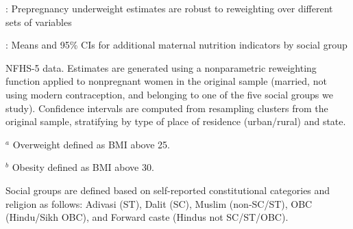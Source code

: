 \documentclass[12pt]{article}
\begin{document}
\begin{landscape}
    


\begin{table}[H]
    \centering

    \begin{threeparttable}
            
    \caption{: Prepregnancy underweight estimates are robust to reweighting over different sets of variables}
    \label{specifications}
    \renewcommand{\arraystretch}{1.5}
    \scriptsize
    \setlength{\tabcolsep}{5pt}
    \resizebox{\textwidth}{!}{%
        
    }
    
    \scriptsize

    
    

    
    
    \end{threeparttable}
\end{table}


\end{landscape}



\newpage
\begin{landscape}
\begin{table}[!htbp]
\centering
\begin{adjustbox}{center, max width=0.95\linewidth} %
\begin{threeparttable}
    \small
    \caption{: Means and 95\% CIs for additional maternal nutrition indicators by social group}
    \label{tab:addnut}

    \setlength{\tabcolsep}{2pt}
    \renewcommand{\arraystretch}{1.35}

    

    \begin{tablenotes}
        \item NFHS-5 data. Estimates are generated using a nonparametric reweighting function applied to nonpregnant women in the original sample (married, not using modern contraception, and belonging to one of the five social groups we study). Confidence intervals are computed from resampling clusters from the original sample, stratifying by type of place of residence (urban/rural) and state.
        \item $^{a}$ Overweight defined as BMI above 25.
        \item $^{b}$ Obesity defined as BMI above 30.
        \item Social groups are defined based on self-reported constitutional categories and religion as follows: Adivasi (ST), Dalit (SC), Muslim  (non‐SC/ST), OBC (Hindu/Sikh OBC), and Forward caste (Hindus not SC/ST/OBC).
    \end{tablenotes}

\end{threeparttable}
\end{adjustbox}
\end{table}
\end{landscape}
\end{document}
